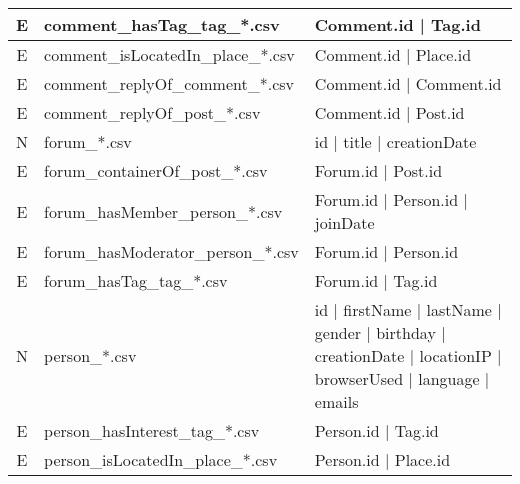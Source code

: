 \begin{table}[htb]
\begin{tabular}{|c|p{4.6cm}|p{11.4cm}|}
        E                       & comment\_hasTag\_tag\_*.csv             & Comment.id | Tag.id                                                                                         \\ \hline
        E                       & comment\_isLocatedIn\_place\_*.csv      & Comment.id | Place.id                                                                                       \\ \hline
        E                       & comment\_replyOf\_comment\_*.csv        & Comment.id | Comment.id                                                                                     \\ \hline
        E                       & comment\_replyOf\_post\_*.csv           & Comment.id | Post.id                                                                                        \\ \hline
        N                       & forum\_*.csv                            & id | title | creationDate                                                                                   \\ \hline
        E                       & forum\_containerOf\_post\_*.csv         & Forum.id | Post.id                                                                                          \\ \hline
        E                       & forum\_hasMember\_person\_*.csv         & Forum.id | Person.id | joinDate                                                                             \\ \hline
        E                       & forum\_hasModerator\_person\_*.csv      & Forum.id | Person.id                                                                                        \\ \hline
        E                       & forum\_hasTag\_tag\_*.csv               & Forum.id | Tag.id                                                                                           \\ \hline
        N                       & person\_*.csv                           & id | firstName | lastName | gender | birthday | creationDate | locationIP | browserUsed | language | emails \\ \hline
        E                       & person\_hasInterest\_tag\_*.csv         & Person.id | Tag.id                                                                                          \\ \hline
        E                       & person\_isLocatedIn\_place\_*.csv       & Person.id | Place.id                                                                                        \\ \hline

\end{tabular}
\end{table}
